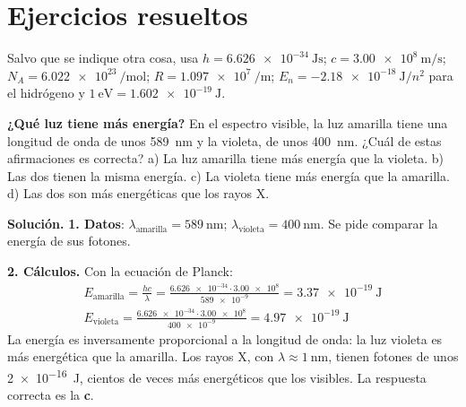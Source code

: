
\section{Ejercicios resueltos}\label{sec:ud3-resueltos}

Salvo que se indique otra cosa, usa \(h = \qty{6.626e-34}{\joule\s}\); \(c = \qty{3.00e8}{\m\per\s}\);
\(N_A = \qty{6.022e23}{\per\mol}\); \(R = \qty{1.097e7}{\per\m}\); \(E_n = -\qty{2.18e-18}{\joule}/n^2\) para el hidrógeno y
\(\qty{1}{\electronvolt} = \qty{1.602e-19}{\joule}\).

\begin{example}
    \textbf{¿Qué luz tiene más energía?} En el espectro visible, la luz amarilla tiene una longitud de onda de unos
    \qty{589}{\nm} y la violeta, de unos \qty{400}{\nm}. ¿Cuál de estas afirmaciones es correcta? a) La luz amarilla tiene más
    energía que la violeta. b) Las dos tienen la misma energía. c) La violeta tiene más energía que la amarilla. d) Las dos son más
    energéticas que los rayos X.

    \textbf{Solución.} \textbf{1. Datos}: \(\lambda_{\text{amarilla}} = \qty{589}{\nm}\); \(\lambda_{\text{violeta}} = \qty{400}{\nm}\).
    Se pide comparar la energía de sus fotones.

    \textbf{2. Cálculos.} Con la ecuación de Planck:
    \begin{gather*}
        E_{\text{amarilla}} = \frac{h c}{\lambda} = \frac{\num{6.626e-34} \cdot \num{3.00e8}}{\num{589e-9}} = \qty{3.37e-19}{\joule} \\
        E_{\text{violeta}} = \frac{\num{6.626e-34} \cdot \num{3.00e8}}{\num{400e-9}} = \qty{4.97e-19}{\joule}
    \end{gather*}
    La energía es inversamente proporcional a la longitud de onda: la luz violeta es más energética que la amarilla. Los rayos X,
    con \(\lambda \approx \qty{1}{\nm}\), tienen fotones de unos \qty{2e-16}{\joule}, cientos de veces más energéticos que los
    visibles. La respuesta correcta es la \textbf{c}.
\end{example}

